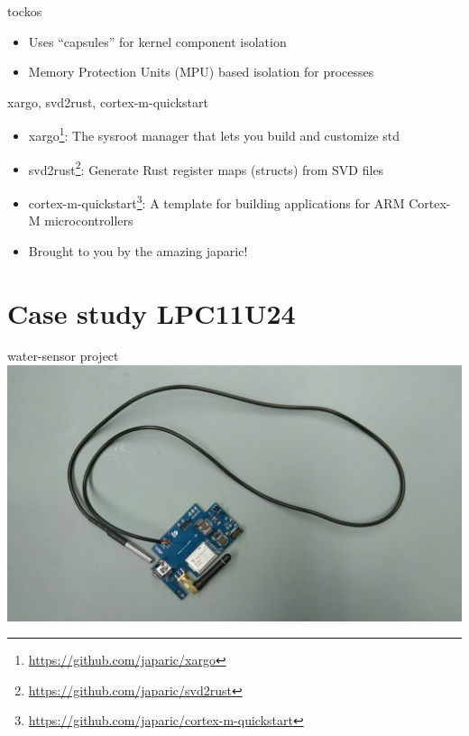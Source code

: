 \documentclass[aspectratio=1610,14pt,t]{beamer}
\begin{document}
\begin{frame}[c]{tockos}
  \begin{itemize}
    \item Uses ``capsules'' for kernel component isolation
    \item Memory Protection Units (MPU) based isolation for processes
  \end{itemize}
\end{frame}

\begin{frame}[c]{xargo, svd2rust, cortex-m-quickstart}
  \begin{itemize}
    \item xargo\footnote{\url{https://github.com/japaric/xargo}}:
      The sysroot manager that lets you build and customize std

    \item svd2rust\footnote{\url{https://github.com/japaric/svd2rust}}:
      Generate Rust register maps (structs) from SVD files

    \item cortex-m-quickstart\footnote{\url{https://github.com/japaric/cortex-m-quickstart}}:
      A template for building applications for ARM Cortex-M microcontrollers
    \item<2-> Brought to you by the amazing japaric!
  \end{itemize}
\end{frame}

\section{Case study LPC11U24}

\begin{frame}[c]{water-sensor project}
  \centering
  \includegraphics[width=.9\textwidth]{img/water-sensor-pcb.png}
\end{frame}
\end{document}
